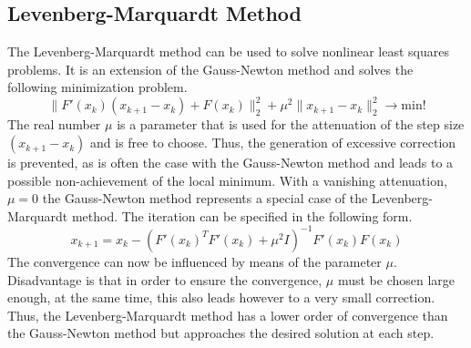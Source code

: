 \documentclass[letterpaper,10pt,english]{sphinxmanual}
\begin{document}
\subsection{Levenberg-Marquardt Method}
\label{guide/background:levenberg-marquardt}\label{guide/background:levenberg-marquardt-method}
The Levenberg-Marquardt method can be used to solve nonlinear least squares problems. It is an extension of the Gauss-Newton method and
solves the following minimization problem.
\begin{equation*}
   \| F'(x_k)(x_{k+1} - x_k) + F(x_k) \|_2^2 + \mu^2 \|x_{k+1} - x_k \|_2^2 \rightarrow \text{min!}
\end{equation*}
The real number \(\mu\) is a parameter that is used for the attenuation of the step size \((x_{k+1} - x_k)\) and is free to choose.
Thus, the generation of excessive correction is prevented, as is often the case with the Gauss-Newton method and leads to a possible
non-achievement of the local minimum. With a vanishing attenuation, \(\mu = 0\) the Gauss-Newton method represents a special case
of the Levenberg-Marquardt method. The iteration can be specified in the following form.
\begin{equation*}
   x_{k+1} = x_k - (F'(x_k)^T F'(x_k) + \mu^2 I)^{-1} F'(x_k) F(x_k)
\end{equation*}
The convergence can now be influenced by means of the parameter \(\mu\). Disadvantage is that in order to ensure the convergence,
\(\mu\) must be chosen large enough, at the same time, this also leads however to a very small correction. Thus, the Levenberg-Marquardt
method has a lower order of convergence than the Gauss-Newton method but approaches the desired solution at each step.
\end{document}
